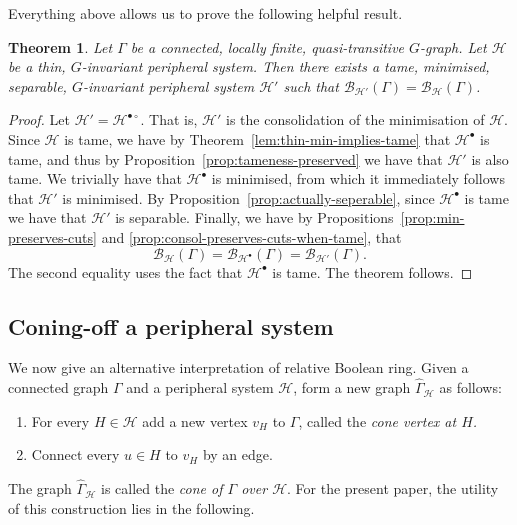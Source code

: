 \documentclass[11pt,a4paper]{amsart}
\newtheorem{theorem}{Theorem}[section]%
\theoremstyle{definition}
\newcommand{\per}{\mathcal{H}}
\newcommand{\br}{{\mathscr{B}}}
\begin{document}
Everything above allows us to prove the following helpful result. 

\begin{theorem}\label{thm:wlog-reduced}
    Let $\Gamma$ be a connected, locally finite, quasi-transitive $G$-graph. Let $\per$ be a thin, $G$-invariant peripheral system. Then there exists a tame, minimised, separable, $G$-invariant peripheral system $\per'$ such that $\br_{\per'}(\Gamma) = \br_\per(\Gamma)$. 
\end{theorem}

\begin{proof}
    Let $\per' = \per^{\bullet\circ}$. That is, $\per'$ is the consolidation of the minimisation of $\per$. Since $\per$ is tame, we have by Theorem~\ref{lem:thin-min-implies-tame} that $\per^\bullet$ is tame, and thus by Proposition~\ref{prop:tameness-preserved} we have that $\per'$ is also tame. We trivially have that $\per^\bullet$ is minimised, from which it immediately follows that $\per'$ is minimised. By Proposition~\ref{prop:actually-seperable}, since $\per^\bullet$ is tame we have that $\per'$ is separable. 
    Finally, we have by Propositions~\ref{prop:min-preserves-cuts} and \ref{prop:consol-preserves-cuts-when-tame}, that 
    $$
    \br_\per(\Gamma) = \br_{\per^\bullet}(\Gamma) = \br_{\per'}(\Gamma).
    $$
    The second equality uses the fact that $\per^\bullet$ is tame. The theorem follows.
\end{proof}



\subsection{Coning-off a peripheral system}\label{sec:cone-off}





We now give an alternative interpretation of relative Boolean ring. Given a connected graph $\Gamma$ and a peripheral system $\per$, form a new graph $\widehat \Gamma_\per$ as follows:
\begin{enumerate}
    \item For every $H \in \per$ add a new vertex $v_H$ to $\Gamma$, called the \textit{cone vertex at $H$.}

    \item Connect every $u \in H$ to $v_H$ by an edge. 
\end{enumerate}
The graph $\widehat \Gamma_\per$ is called the \emph{cone of $\Gamma$ over $\per$}. For the present paper, the utility of this construction lies in the following. 
\end{document}
